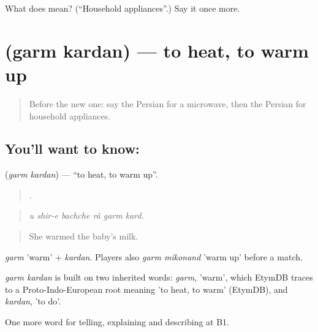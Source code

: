 \begin{tcolorbox}[breakable,colback=teal!4,colframe=teal!35!black,title={Before you move on}]
What does   mean? (\textquotedblleft{}Household appliances\textquotedblright{}.) Say it once more.
\end{tcolorbox}
\section[\texorpdfstring{\fa{گرم} \fa{کردن} (garm kardan)}{گرم کردن (garm kardan)}]{  (garm kardan) — to heat, to warm up}

\label{lesson:FA-C538-garm-kardan}



\begin{quote}
Before the new one: say the Persian for a microwave, then the Persian for household appliances.
\end{quote}

\subsection*{You'll want to know:  }
\textbf{ } (\emph{garm kardan}) — \textquotedblleft{}to heat, to warm up\textquotedblright{}.

\begin{quote}
     .
\end{quote}

\begin{quote}
\emph{u shir-e bachche râ garm kard.}
\end{quote}

\begin{quote}
She warmed the baby's milk.
\end{quote}

\emph{garm} 'warm' + \emph{kardan}. Players also \emph{garm mikonand} 'warm up' before a match.

\begin{cousinweb}
\emph{garm kardan} is built on two inherited words: \emph{garm}, 'warm', which EtymDB traces to a Proto-Indo-European root meaning 'to heat, to warm' (EtymDB), and \emph{kardan}, 'to do'.
\end{cousinweb}

\begin{grammarlens}[title={What you've built}]
One more word for telling, explaining and describing at B1.
\end{grammarlens}

